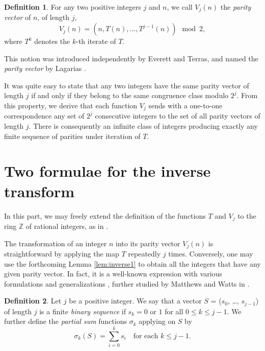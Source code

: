 \documentclass[12pt]{article}
\theoremstyle{definition}
\newtheorem{definition}{Definition}
\begin{document}
\begin{definition}
\label{def:parvec}
For any two positive integers $j$ and $n$, we call $V_j(n)$ the {\em parity vector} of $n$, of length $j$,
\begin{equation}
V_j(n) = \left(  n, T(n), \ldots , T^{j-1}(n) \right)   \mod 2,
\end{equation}
where $T^k$ denotes the $k$-th iterate of $T$.
\end{definition}
This notion was introduced independently by Everett and Terras, and named the \textit{parity vector} by Lagarias \cite{Lag85}.

It was quite easy to state \cite{Eve77,Ter76} that any two integers have the same parity vector of length $j$ if and only if they belong to the same congruence class modulo $2^j$. From this property, we derive that each function $V_j$ sends with a one-to-one correspondence any set of $2^j$ consecutive integers to the set of all parity vectors of length $j$. There is consequently an infinite class of integers producing exactly any finite sequence of parities under iteration of $T$.
 
\section{Two formulae for the inverse transform}
In this part, we may freely extend the definition of the functions $T$ and $V_j$ to the ring $\mathbb{Z}$ of rational integers, as in \cite{Lag85}.

The transformation of an integer $n$ into its parity vector $V_j(n)$ is straightforward by applying the map $T$ repeatedly $j$ times. Conversely, one may use the forthcoming Lemma \ref{lem:inverse1} to obtain all the integers that have any given parity vector. In fact, it is a well-known expression with various formulations \cite{Boh78, Mon04, Ter76} and generalizations \cite{Ber96,Mol78}, further studied by Matthews and Watts in \cite{Mat84}.

\begin{definition}
Let $j$ be a positive integer. We say that a vector $S$ = ($s_0$, \ldots, $s_{j-1}$) of length $j$ is a finite {\em binary sequence} if $s_k = 0$ or $1$ for all $0 \leq k \leq j-1$.
We further define the {\em partial sum} functions $\sigma_k$ applying on $S$ by
\begin{equation} \label{eq:sigma_k}
\sigma_{k}(S) = \sum_{i=0}^{k} s_{i} \quad \text{for each } k \leq j-1.
\end{equation}
\end{definition}
\end{document}
